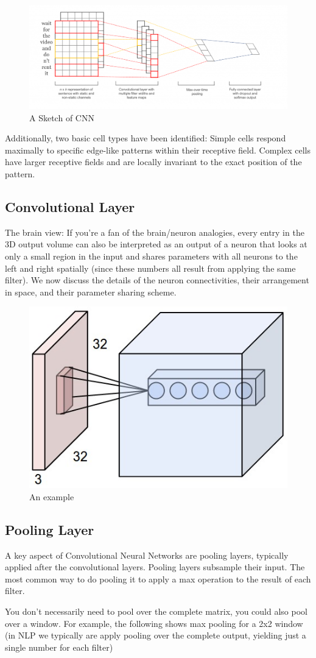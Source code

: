 \documentclass{article}
\begin{document}
\begin{figure}[H]
\centering
\includegraphics[width=.4\textwidth]{1.png}
\caption{A Sketch of CNN}
\end{figure}

Additionally, two basic cell types have been identified: Simple cells respond maximally to specific edge-like patterns within their receptive field. Complex cells have larger receptive fields and are locally invariant to the exact position of the pattern.

\subsection{Convolutional Layer}
\quad The brain view: If you’re a fan of the brain/neuron analogies, every entry in the 3D output volume can also be interpreted as an output of a neuron that looks at only a small region in the input and shares parameters with all neurons to the left and right spatially (since these numbers all result from applying the same filter). We now discuss the details of the neuron connectivities, their arrangement in space, and their parameter sharing scheme.

\begin{figure}[H]
\centering
\includegraphics[width=.2\textwidth]{depthcol.jpeg}
\caption{An example }
\end{figure}

\subsection{Pooling Layer}

\quad A key aspect of Convolutional Neural Networks are pooling layers, typically applied after the convolutional layers. Pooling layers subsample their input. The most common way to do pooling it to apply a max operation to the result of each filter. 

You don’t necessarily need to pool over the complete matrix, you could also pool over a window. For example, the following shows max pooling for a 2x2 window (in NLP we typically are apply pooling over the complete output, yielding just a single number for each filter)
\end{document}

